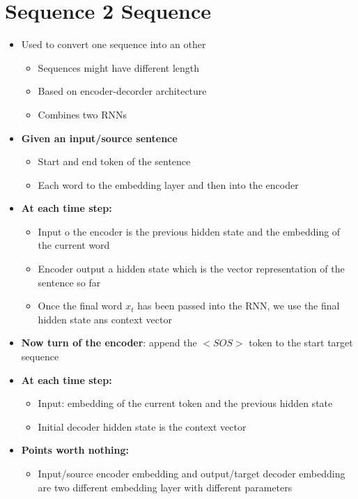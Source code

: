 \section{Sequence 2 Sequence}
\begin{itemize}
    \item Used to convert one sequence into an other
    \begin{itemize}
        \item Sequences might have different length
        \item Based on encoder-decorder architecture
        \item Combines two RNNs
    \end{itemize}
    \item \textbf{Given an input/source sentence}
    \begin{itemize}
        \item Start and end token of the sentence
        \item Each word to the embedding layer and then into the encoder
    \end{itemize}
    \item \textbf{At each time step:}
    \begin{itemize}
        \item Input o the encoder is the previous hidden state and the embedding of the current word
        \item Encoder output a hidden state which is the vector representation of the sentence so far
        \item Once the final word \(x_t\) has been passed into the RNN, we use the final hidden state ans context vector
    \end{itemize}
    \item \textbf{Now turn of the encoder}: append the \(<SOS>\) token to the start target sequence
    \item \textbf{At each time step:}
    \begin{itemize}
        \item Input: embedding of the current token and the previous hidden state
        \item Initial decoder hidden state is the context vector
    \end{itemize}
    \item \textbf{Points worth nothing:}
    \begin{itemize}
        \item Input/source encoder embedding and output/target decoder embedding are two different embedding layer with different parameters

\end{itemize}
\end{itemize}
